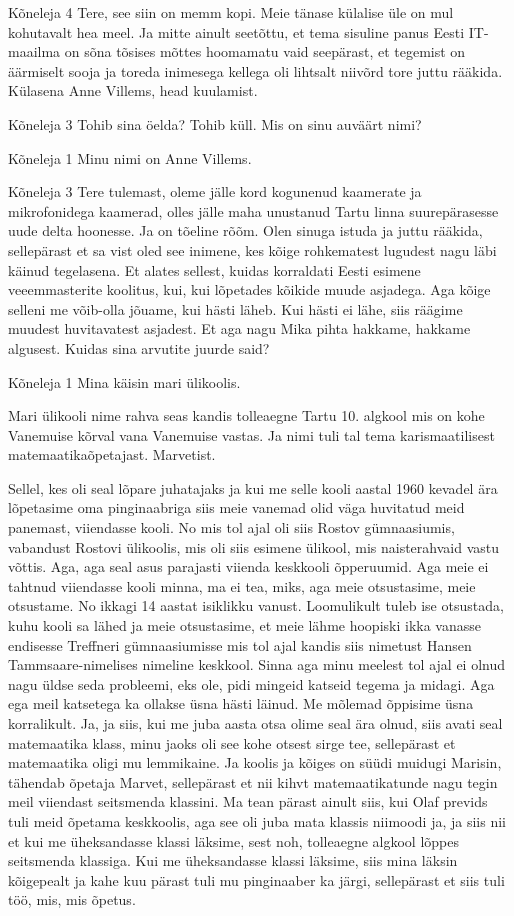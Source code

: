 Kõneleja 4
Tere, see siin on memm kopi. Meie tänase külalise üle on mul kohutavalt hea meel. Ja mitte ainult seetõttu, et tema sisuline panus Eesti IT-maailma on sõna tõsises mõttes hoomamatu vaid seepärast, et tegemist on äärmiselt sooja ja toreda inimesega kellega oli lihtsalt niivõrd tore juttu rääkida. Külasena Anne Villems, head kuulamist. 

Kõneleja 3
Tohib sina öelda? Tohib küll. Mis on sinu auväärt nimi? 

Kõneleja 1
Minu nimi on Anne Villems. 

Kõneleja 3
Tere tulemast, oleme jälle kord kogunenud kaamerate ja mikrofonidega kaamerad, olles jälle maha unustanud Tartu linna suurepärasesse uude delta hoonesse. Ja on tõeline rõõm. Olen sinuga istuda ja juttu rääkida, sellepärast et sa vist oled see inimene, kes kõige rohkematest lugudest nagu läbi käinud tegelasena. Et alates sellest, kuidas korraldati Eesti esimene veeemmasterite koolitus, kui, kui lõpetades kõikide muude asjadega. Aga kõige selleni me võib-olla jõuame, kui hästi läheb. Kui hästi ei lähe, siis räägime muudest huvitavatest asjadest. Et aga nagu Mika pihta hakkame, hakkame algusest. Kuidas sina arvutite juurde said? 

Kõneleja 1
Mina käisin mari ülikoolis. 

Mari ülikooli nime rahva seas kandis tolleaegne Tartu 10. algkool mis on kohe Vanemuise kõrval vana Vanemuise vastas. Ja nimi tuli tal tema karismaatilisest matemaatikaõpetajast. Marvetist. 

Sellel, kes oli seal lõpare juhatajaks ja kui me selle kooli aastal 1960 kevadel ära lõpetasime oma pinginaabriga siis meie vanemad olid väga huvitatud meid panemast, viiendasse kooli. No mis tol ajal oli siis Rostov gümnaasiumis, vabandust Rostovi ülikoolis, mis oli siis esimene ülikool, mis naisterahvaid vastu võttis. Aga, aga seal asus parajasti viienda keskkooli õpperuumid. Aga meie ei tahtnud viiendasse kooli minna, ma ei tea, miks, aga meie otsustasime, meie otsustame. No ikkagi 14 aastat isiklikku vanust. Loomulikult tuleb ise otsustada, kuhu kooli sa lähed ja meie otsustasime, et meie lähme hoopiski ikka vanasse endisesse Treffneri gümnaasiumisse mis tol ajal kandis siis nimetust Hansen Tammsaare-nimelises nimeline keskkool. Sinna aga minu meelest tol ajal ei olnud nagu üldse seda probleemi, eks ole, pidi mingeid katseid tegema ja midagi. Aga ega meil katsetega ka ollakse üsna hästi läinud. Me mõlemad õppisime üsna korralikult. Ja, ja siis, kui me juba aasta otsa olime seal ära olnud, siis avati seal matemaatika klass, minu jaoks oli see kohe otsest sirge tee, sellepärast et matemaatika oligi mu lemmikaine. Ja koolis ja kõiges on süüdi muidugi Marisin, tähendab õpetaja Marvet, sellepärast et nii kihvt matemaatikatunde nagu tegin meil viiendast seitsmenda klassini. Ma tean pärast ainult siis, kui Olaf previds tuli meid õpetama keskkoolis, aga see oli juba mata klassis niimoodi ja, ja siis nii et kui me üheksandasse klassi läksime, sest noh, tolleaegne algkool lõppes seitsmenda klassiga. Kui me üheksandasse klassi läksime, siis mina läksin kõigepealt ja kahe kuu pärast tuli mu pinginaaber ka järgi, sellepärast et siis tuli töö, mis, mis õpetus. 

